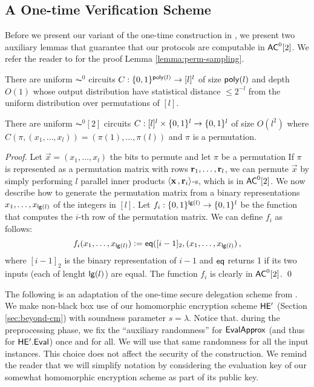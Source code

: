 \subsection{A One-time Verification Scheme}

Before we present our variant of the one-time construction in \cite{ckv10}, we present two auxiliary lemmas that guarantee that our protocols are computable in ${\mathsf{AC}}^0[2]$. We refer the reader to \cite{hag91,matias91} for the proof Lemma \ref{lemma:perm-sampling}. %

\begin{lemma}{\cite{hag91,matias91}}
\label{lemma:perm-sampling}
There are uniform $\AC^0$ circuits $C: \{0, 1\}^{\mathsf{poly}(l)}\to [l]^l$ of size $\mathsf{poly}(l)$ and depth $O(1)$ whose output distribution have statistical distance $\leq 2^{-l}$ from the uniform distribution over permutations of $[l]$.
\end{lemma}

\begin{lemma}
\label{lemma:perm-evaluation}
There are uniform $\AC^0[2]$ circuits $C: [l]^l \times \{0, 1\}^l \to \{0, 1\}^l$ of size $O(l^2)$ where $C(\pi, (x_1,\dots, x_l)) = (\pi(1),\dots,\pi(l))$ and $\pi$ is a permutation.
\end{lemma}
\begin{proof}
Let $\vec{x} = (x_1,\dots,x_l)$ the bits to permute and let $\pi$ be a permutation
If $\pi$ is represented as a permutation matrix with rows $\mathbf{r}_1,\dots,\mathbf{r}_l$, we can permute $\vec{x}$ by simply performing $l$ parallel inner products $\langle \mathbf{x} \, , \mathbf{r}_i \rangle$-s, which is in ${\mathsf{AC}}^0[2]$.
We now describe how to generate the permutation matrix from a binary representations $x_1,\dots,x_{\mathsf{lg}(l)}$ of the integers in $[l]$.
Let $f_i : \{0, 1\}^{\mathsf{lg}(l)} \to \{0, 1\}^l$ be the function that computes the $i$-th row of the permutation matrix. We can define $f_i$ as follows:
\[
    f_i(x_1,\dots,x_{\mathsf{lg}(l)}) \vcentcolon= \mathsf{eq}([i-1]_2, (x_1,\dots,x_{\mathsf{lg}(l)}) \, ,
\]
where $[i-1]_2$ is the binary representation of $i-1$ and $\mathsf{eq}$ returns 1 if its two inputs (each of lenght $\mathsf{lg}(l)$) are equal.
The function $f_i$ is clearly in ${\mathsf{AC}}^0[2]$.
\qed
\end{proof}

The following is an adaptation of the one-time secure delegation scheme from \cite{ckv10}. We make non-black box use of our homomorphic encryption scheme $\mathsf{HE'}$ (Section \ref{sec:beyond-cm}) with soundness parameter $s= \lambda$. Notice that. during the preprocessing phase, we fix the ``auxiliary randomness'' for $\mathsf{EvalApprox}$ (and thus for $\mathsf{HE'.Eval}$) once and for all. We will use that same randomness for all the input instances. This choice does not affect the security of the construction.
We remind the reader that we will simplify notation by considering the evaluation key of our somewhat homomorphic encryption scheme as part of its public key.

